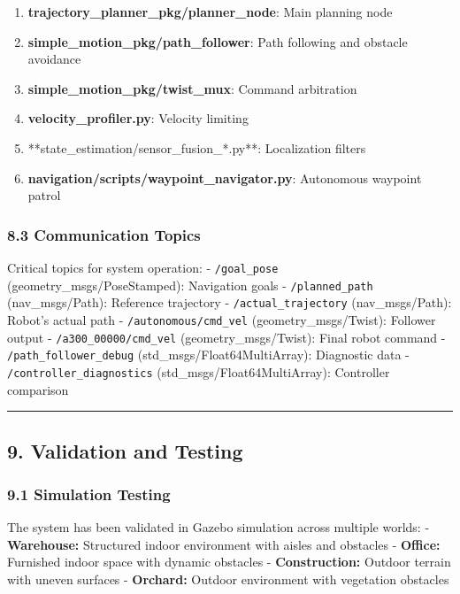 \begin{enumerate}
\def\labelenumi{\arabic{enumi}.}
\tightlist
\item
  \textbf{trajectory\_planner\_pkg/planner\_node}: Main planning node
\item
  \textbf{simple\_motion\_pkg/path\_follower}: Path following and
  obstacle avoidance
\item
  \textbf{simple\_motion\_pkg/twist\_mux}: Command arbitration
\item
  \textbf{velocity\_profiler.py}: Velocity limiting
\item
  **state\_estimation/sensor\_fusion\_*.py**: Localization filters
\item
  \textbf{navigation/scripts/waypoint\_navigator.py}: Autonomous
  waypoint patrol
\end{enumerate}

\hypertarget{communication-topics}{%
\subsubsection{8.3 Communication Topics}\label{communication-topics}}

Critical topics for system operation: - \texttt{/goal\_pose}
(geometry\_msgs/PoseStamped): Navigation goals - \texttt{/planned\_path}
(nav\_msgs/Path): Reference trajectory - \texttt{/actual\_trajectory}
(nav\_msgs/Path): Robot's actual path - \texttt{/autonomous/cmd\_vel}
(geometry\_msgs/Twist): Follower output - \texttt{/a300\_00000/cmd\_vel}
(geometry\_msgs/Twist): Final robot command -
\texttt{/path\_follower\_debug} (std\_msgs/Float64MultiArray):
Diagnostic data - \texttt{/controller\_diagnostics}
(std\_msgs/Float64MultiArray): Controller comparison

\begin{center}\rule{0.5\linewidth}{0.5pt}\end{center}

\hypertarget{validation-and-testing}{%
\subsection{9. Validation and Testing}\label{validation-and-testing}}

\hypertarget{simulation-testing}{%
\subsubsection{9.1 Simulation Testing}\label{simulation-testing}}

The system has been validated in Gazebo simulation across multiple
worlds: - \textbf{Warehouse:} Structured indoor environment with aisles
and obstacles - \textbf{Office:} Furnished indoor space with dynamic
obstacles - \textbf{Construction:} Outdoor terrain with uneven surfaces
- \textbf{Orchard:} Outdoor environment with vegetation obstacles

